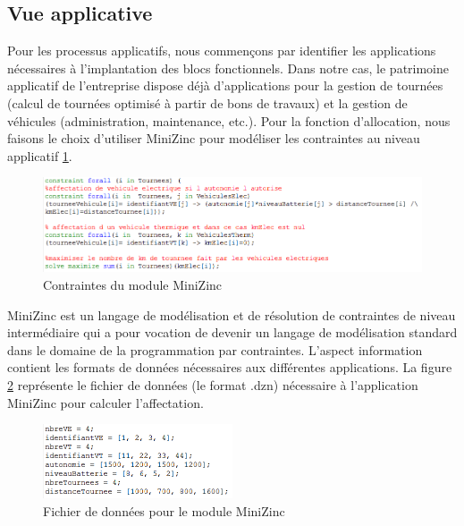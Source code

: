 \subsection{Vue applicative}

Pour les processus applicatifs, nous commençons par identifier 
les applications nécessaires à l'implantation des blocs fonctionnels. Dans notre cas, le patrimoine applicatif de l'entreprise dispose déjà d'applications pour la gestion de tournées (calcul de tournées optimisé à partir de bons de travaux) et la gestion de véhicules (administration, maintenance, etc.). Pour la fonction d'allocation, nous faisons le choix d'utiliser MiniZinc pour modéliser les contraintes au niveau applicatif \ref{fig:contraintesMiniZinc}. 

\begin{figure}[!htbp]
 \begin{center}
  \includegraphics[width=1\textwidth]{images/implementation/module_minizinc.png}
 \end{center}
 \caption{Contraintes du module MiniZinc}
 \label{fig:contraintesMiniZinc}
\end{figure} 

MiniZinc est un langage de modélisation et de résolution de contraintes de niveau intermédiaire qui a pour vocation de devenir un langage de modélisation standard dans le domaine de la programmation par contraintes. L'aspect information contient les formats de données nécessaires aux différentes applications. La figure \ref{fig:formatMiniZinc} représente le fichier de données (le format .dzn) nécessaire à l'application MiniZinc pour calculer l'affectation. 

\begin{figure}[!htbp]
 \begin{center}
  \includegraphics[width=0.5\textwidth]{images/implementation/format_minizinc.png}
 \end{center}
 \caption{Fichier de données pour le module MiniZinc}
 \label{fig:formatMiniZinc}
\end{figure} 

